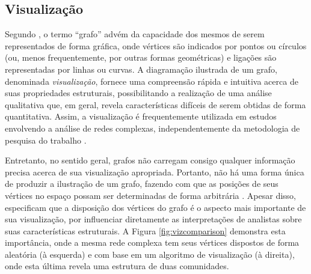 \subsection{Visualização} \label{sec:visualization}

Segundo , o termo ``grafo'' advém da capacidade dos mesmos de serem representados de forma gráfica, onde vértices são indicados por pontos ou círculos (ou, menos frequentemente, por outras formas geométricas) e ligações são representadas por linhas ou curvas. A diagramação ilustrada de um grafo, denominada \emph{visualização}, fornece uma compreensão rápida e intuitiva acerca de suas propriedades estruturais, possibilitando a realização de uma análise qualitativa que, em geral, revela características difíceis de serem obtidas de forma quantitativa. Assim, a visualização é frequentemente utilizada em estudos envolvendo a análise de redes complexas, independentemente da metodologia de pesquisa do trabalho \cite{Borgatti2013,Bondy1976}.

Entretanto, no sentido geral, grafos não carregam consigo qualquer informação precisa acerca de sua visualização apropriada. Portanto, não há uma forma única de produzir a ilustração de um grafo, fazendo com que as posições de seus vértices no espaço possam ser determinadas de forma arbitrária \cite{Bondy1976}. Apesar disso,  especificam que a disposição dos vértices do grafo é o aspecto mais importante de sua visualização, por influenciar diretamente as interpretações de analistas sobre suas características estruturais. A Figura \ref{fig:vizcomparison} demonstra esta importância, onde a mesma rede complexa tem seus vértices dispostos de forma aleatória (à esquerda) e com base em um algoritmo de visualização (à direita), onde esta última revela uma estrutura de duas comunidades.

